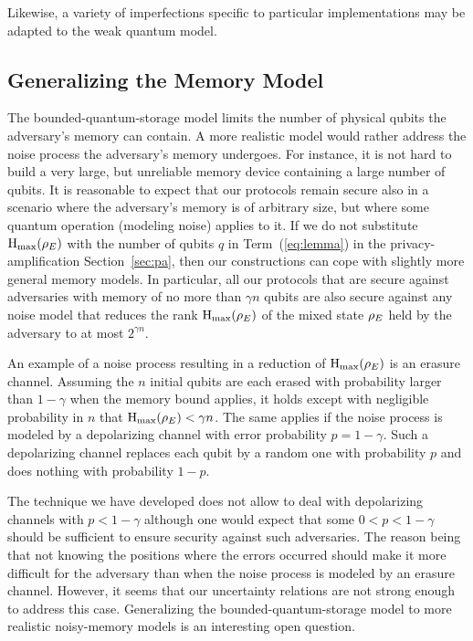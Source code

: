 Likewise, a variety of imperfections specific to particular
implementations may be adapted to the weak quantum model.
 
\subsection{Generalizing the Memory Model} \label{sec:noisymem}
The bounded-quantum-storage model
 limits the number of physical qubits
the adversary's memory can contain. A more realistic model would
rather address the noise process the adversary's memory undergoes.
For instance, it is not hard to build a very large, but unreliable
memory device containing a large number of qubits. It is reasonable to
expect that our protocols remain secure also in a scenario where the
adversary's memory is of arbitrary size, but where some quantum
operation (modeling noise) applies to it. If we do not substitute
$\operatorname{H}_{\rm max}(\rho_{E})$ with the number of qubits $q$ in
Term~(\ref{eq:lemma}) in the privacy-amplification
Section~\ref{sec:pa}, then our constructions can cope with slightly
more general memory models. In particular, all our protocols that are
secure against adversaries with memory of no more than $\gamma n$
qubits are also secure against any noise model that reduces the rank
$\operatorname{H}_{\rm max}(\rho_{E})$ of the mixed state $\rho_{E}$ held by the
adversary to at most $2^{\gamma n}$. 

An example of a noise process resulting in a reduction of $\operatorname{H}_{\rm max}(\rho_{E})$
is an erasure channel. Assuming the $n$ initial qubits are each erased
with probability larger than $1-\gamma$ when the memory bound applies,
it holds except with negligible probability in $n$ that
$\operatorname{H}_{\rm max}(\rho_{E})<\gamma n$.  The same applies if the noise process is
modeled by a depolarizing channel with error probability
$p=1-\gamma$. Such a depolarizing channel replaces each qubit by a
random one with probability $p$ and does nothing with probability
$1-p$.

The technique we have developed does not allow to deal with depolarizing channels
with $p < 1-\gamma$ although one would expect that some $0< p < 1-\gamma$
should be sufficient to ensure security against such adversaries.
The reason being that not knowing the positions where the errors occurred
should make it more difficult for the adversary than when the noise process
is modeled by an erasure channel. However, it seems that our uncertainty 
relations 
are not strong enough to address this case. Generalizing the
bounded-quantum-storage model to more realistic noisy-memory models is
an interesting open question.


